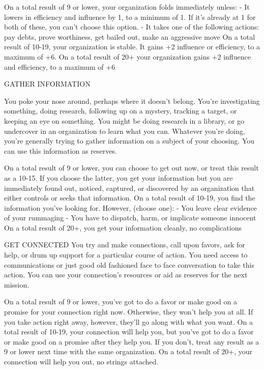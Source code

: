 On a total result of 9 or lower, your organization folds immediately unless:
    -    It lowers in efficiency and influence by 1, to a minimum of 1. If it’s already at 1 for both of
         these, you can’t choose this option.
    -    It takes one of the following actions: pay debts, prove worthiness, get bailed out, make an
         aggressive move
On a total result of 10-19, your organization is stable. It gains +2 influence or efficiency, to a
maximum of +6.
On a total result of 20+ your organization gains +2 influence and efficiency, to a maximum of +6

GATHER INFORMATION




You poke your nose around, perhaps where it doesn’t belong. You’re investigating something,
doing research, following up on a mystery, tracking a target, or keeping an eye on something. You
might be doing research in a library, or go undercover in an organization to learn what you can.
Whatever you’re doing, you’re generally trying to gather information on a subject of your choosing.
You can use this information as reserves.

On a total result of 9 or lower, you can choose to get out now, or treat this result as a 10-15. If you
choose the latter, you get your information but you are immediately found out, noticed, captured,
or discovered by an organization that either controls or seeks that information.
On a total result of 10-19, you find the information you’ve looking for. However, (choose one):
    -    You leave clear evidence of your rummaging
    -    You have to dispatch, harm, or implicate someone innocent
On a total result of 20+, you get your information cleanly, no complications

GET CONNECTED
You try and make connections, call upon favors, ask for help, or drum up support for a particular
course of action. You need access to communications or just good old fashioned face to face
conversation to take this action. You can use your connection’s resources or aid as reserves for
the next mission.

On a total result of 9 or lower, you’ve got to do a favor or make good on a promise for your
connection right now. Otherwise, they won’t help you at all. If you take action right away, however,
they’ll go along with what you want.
On a total result of 10-19, your connection will help you, but you’ve got to do a favor or make good
on a promise after they help you. If you don’t, treat any result as a 9 or lower next time with the
same organization.
On a total result of 20+, your connection will help you out, no strings attached.

